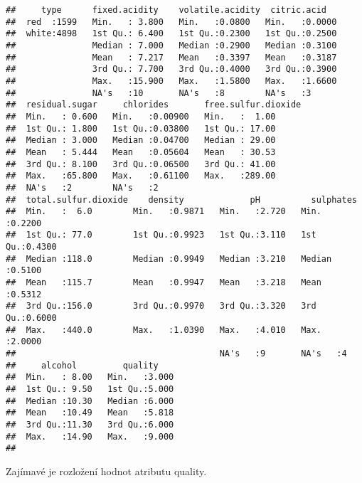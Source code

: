 \documentclass[]{article}
\begin{document}
\begin{verbatim}
##     type      fixed.acidity    volatile.acidity  citric.acid    
##  red  :1599   Min.   : 3.800   Min.   :0.0800   Min.   :0.0000  
##  white:4898   1st Qu.: 6.400   1st Qu.:0.2300   1st Qu.:0.2500  
##               Median : 7.000   Median :0.2900   Median :0.3100  
##               Mean   : 7.217   Mean   :0.3397   Mean   :0.3187  
##               3rd Qu.: 7.700   3rd Qu.:0.4000   3rd Qu.:0.3900  
##               Max.   :15.900   Max.   :1.5800   Max.   :1.6600  
##               NA's   :10       NA's   :8        NA's   :3       
##  residual.sugar     chlorides       free.sulfur.dioxide
##  Min.   : 0.600   Min.   :0.00900   Min.   :  1.00     
##  1st Qu.: 1.800   1st Qu.:0.03800   1st Qu.: 17.00     
##  Median : 3.000   Median :0.04700   Median : 29.00     
##  Mean   : 5.444   Mean   :0.05604   Mean   : 30.53     
##  3rd Qu.: 8.100   3rd Qu.:0.06500   3rd Qu.: 41.00     
##  Max.   :65.800   Max.   :0.61100   Max.   :289.00     
##  NA's   :2        NA's   :2                            
##  total.sulfur.dioxide    density             pH          sulphates     
##  Min.   :  6.0        Min.   :0.9871   Min.   :2.720   Min.   :0.2200  
##  1st Qu.: 77.0        1st Qu.:0.9923   1st Qu.:3.110   1st Qu.:0.4300  
##  Median :118.0        Median :0.9949   Median :3.210   Median :0.5100  
##  Mean   :115.7        Mean   :0.9947   Mean   :3.218   Mean   :0.5312  
##  3rd Qu.:156.0        3rd Qu.:0.9970   3rd Qu.:3.320   3rd Qu.:0.6000  
##  Max.   :440.0        Max.   :1.0390   Max.   :4.010   Max.   :2.0000  
##                                        NA's   :9       NA's   :4       
##     alcohol         quality     
##  Min.   : 8.00   Min.   :3.000  
##  1st Qu.: 9.50   1st Qu.:5.000  
##  Median :10.30   Median :6.000  
##  Mean   :10.49   Mean   :5.818  
##  3rd Qu.:11.30   3rd Qu.:6.000  
##  Max.   :14.90   Max.   :9.000  
## 
\end{verbatim}

Zajímavé je rozložení hodnot atributu quality.
\end{document}
